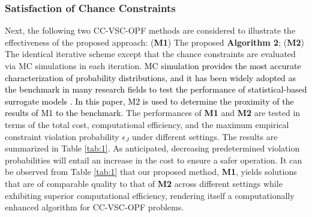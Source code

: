 \documentclass[journal]{IEEEtran}
\theoremstyle{definition}
\theoremstyle{remark}
\begin{document}
\subsubsection{Satisfaction of Chance Constraints}
Next, the following two CC-VSC-OPF methods are considered to illustrate the effectiveness of the proposed approach: 
(\textbf{M1}) The proposed \textbf{Algorithm 2};
(\textbf{M2}) The identical iterative scheme except that the chance constraints are evaluated via MC simulations in each iteration. \textcolor{black}{MC simulation provides the most accurate characterization of probability distributions, and it has been widely adopted as the benchmark in many research fields to test the performance of statistical-based surrogate models \cite{moustapha2022active,klink2022efficient,peng2021multi}. In this paper, M2 is used to determine the proximity of the results of M1 to the benchmark.}
The performances of \textbf{M1} and \textbf{M2} are tested in terms of the total cost, computational efficiency, and the maximum empirical constraint violation probability $\epsilon_J$ under different settings. The results are summarized in Table \ref{tab:1}. 
As anticipated, decreasing predetermined violation probabilities will entail an increase in the cost to ensure a safer operation. It can be observed from Table \ref{tab:1} that our proposed method, \textbf{M1}, yields solutions that are of comparable quality to that of \textbf{M2} across different settings while exhibiting superior computational efficiency, rendering itself a computationally enhanced algorithm for CC-VSC-OPF problems.   
\end{document}

